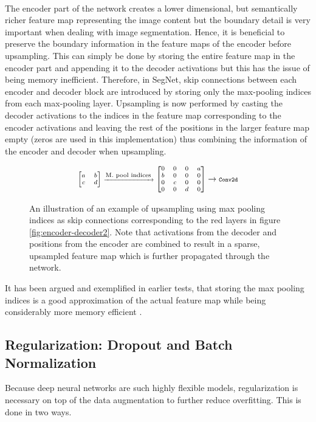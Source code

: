 \documentclass{article}
\begin{document}
\\
The encoder part of the network creates a lower dimensional, but semantically richer feature map representing the image content but the boundary detail is very important when dealing with image segmentation.
Hence, it is beneficial to preserve the boundary information in the feature maps of the encoder before upsampling.
This can simply be done by storing the entire feature map in the encoder part and appending it to the decoder activations but this has the issue of being memory inefficient. 
Therefore, in SegNet, skip connections between each encoder and decoder block are introduced by storing only the max-pooling indices from each max-pooling layer. 
Upsampling is now performed by casting the decoder activations to the indices in the feature map corresponding to the encoder activations and leaving the rest of the positions in the larger feature map empty (zeros are used in this implementation) thus combining the information of the encoder and decoder when upsampling.

 \begin{figure}[htb!]
 	\begin{equation*}\label{key}
\scriptsize
\begin{bmatrix}a&b\\c&d\end{bmatrix} \xrightarrow{\text{\scriptsize M. pool indices}}
\begin{bmatrix}0&0&0&a\\b&0&0&0\\0&c&0&0\\0&0&d&0\end{bmatrix} 
\rightarrow 
\texttt{\scriptsize Conv2d}
\end{equation*}
 	\caption{An illustration of an example of upsampling using max pooling indices as skip connections corresponding to the red layers in figure \ref{fig:encoder-decoder2}. Note that activations from the decoder and positions from the encoder are combined to result in a sparse, upsampled feature map which is further propagated through the network.}
\end{figure}
\noindent 
It has been argued and exemplified in earlier tests, that storing the max pooling indices is a good approximation of the actual feature map  while being considerably more memory efficient \cite{seg}. 



\subsection{Regularization: Dropout and Batch Normalization}
Because deep neural networks are such highly flexible models, regularization is necessary on top of the data augmentation to further reduce overfitting.
This is done in two ways.
\end{document}
